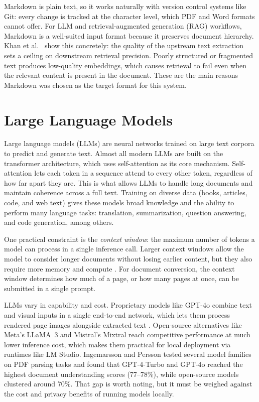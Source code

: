 Markdown is plain text, so it works naturally with version control systems like
Git: every change is tracked at the character level, which PDF and Word formats
cannot offer. For LLM and retrieval-augmented generation (RAG) workflows,
Markdown is a well-suited input format because it preserves document hierarchy.
Khan et al.\ \autocite{khan2024} show this concretely: the quality of the upstream
text extraction sets a ceiling on downstream retrieval precision. Poorly
structured or fragmented text produces low-quality embeddings, which causes
retrieval to fail even when the relevant content is present in the document.
These are the main reasons Markdown was chosen as the target format for this
system.

\section{Large Language Models}
\label{sec:background:llms}

Large language models (LLMs) are neural networks trained on large text corpora
to predict and generate text. Almost all modern LLMs are built on the
transformer architecture, which uses self-attention as its core mechanism.
Self-attention lets each token in a sequence attend to every other token,
regardless of how far apart they are. This is what allows LLMs to handle long
documents and maintain coherence across a full text. Training on diverse data (books, articles, code, and web text) gives these
models broad knowledge
and the ability to perform many language tasks: translation, summarization,
question answering, and code generation, among others.

One practical constraint is the \textit{context window}: the maximum number of
tokens a model can process in a single inference call. Larger context windows
allow the model to consider longer documents without losing earlier content, but
they also require more memory and compute \autocite{ingemarsson2024}. For document
conversion, the context window determines how much of a page, or how many pages at once,
can be submitted in a single prompt.

LLMs vary in capability and cost. Proprietary models like GPT-4o combine text
and visual inputs in a single end-to-end network, which lets them process
rendered page images alongside extracted text \autocite{ingemarsson2024}.
Open-source alternatives like Meta's LLaMA~3 and Mistral's Mixtral reach
competitive performance at much lower inference cost, which makes them
practical for local deployment via runtimes like LM Studio. Ingemarsson and
Persson \autocite{ingemarsson2024} tested several model families on PDF parsing
tasks and found that GPT-4-Turbo and GPT-4o reached the highest document
understanding scores (77--78\%), while open-source models clustered around
70\%. That gap is worth noting, but it must be weighed against the cost and
privacy benefits of running models locally.

